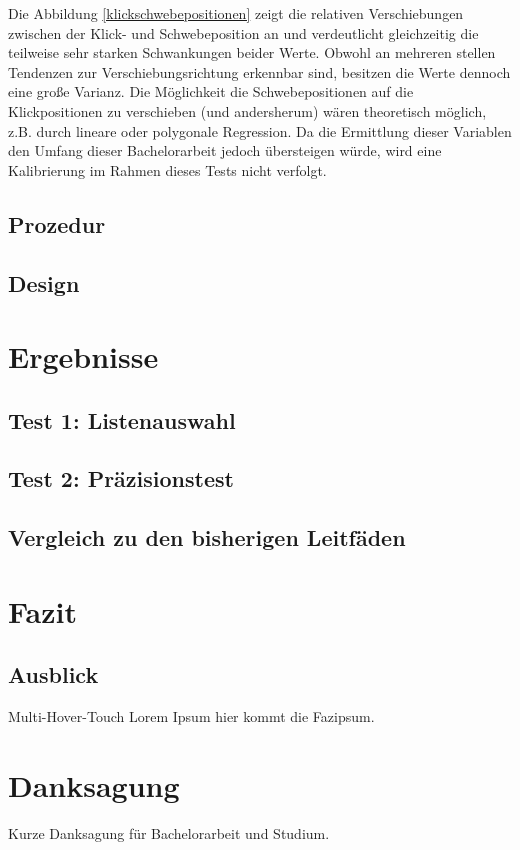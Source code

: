 \documentclass[a4paper,12pt,bibliography=totoc]{scrreprt}%
\begin{document}
Die Abbildung \ref{klickschwebepositionen} zeigt die relativen Verschiebungen zwischen der Klick- und Schwebeposition an und verdeutlicht gleichzeitig die teilweise sehr starken Schwankungen beider Werte.
Obwohl an mehreren stellen Tendenzen zur Verschiebungsrichtung erkennbar sind, besitzen die Werte dennoch eine große Varianz. Die Möglichkeit die Schwebepositionen auf die Klickpositionen zu verschieben (und andersherum) wären theoretisch möglich, z.B. durch lineare oder polygonale Regression. Da die Ermittlung dieser Variablen den Umfang dieser Bachelorarbeit jedoch übersteigen würde, wird eine Kalibrierung im Rahmen dieses Tests nicht verfolgt.

\section{Prozedur}


\section{Design}


\chapter{Ergebnisse}


\section{Test 1: Listenauswahl}


\section{Test 2: Präzisionstest}


\section{Vergleich zu den bisherigen Leitfäden}


\chapter{Fazit}


\section{Ausblick}
Multi-Hover-Touch
Lorem Ipsum hier kommt die Fazipsum.

\chapter{Danksagung}
Kurze Danksagung für Bachelorarbeit und Studium.
\end{document}
